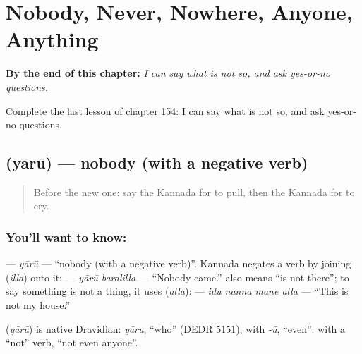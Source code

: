 
\chapter{Nobody, Never, Nowhere, Anyone, Anything}
\label{ch:ka-nobody-never-nowhere-anyone-anything}

\begin{chapteropening}
\textbf{By the end of this chapter:} \emph{I can say what is not so, and ask yes-or-no questions.}

Complete the last lesson of chapter 154: I can say what is not so, and ask yes-or-no questions.
\end{chapteropening}

\section[\texorpdfstring{\kn{ಯಾರೂ} (yārū)}{ಯಾರೂ (yārū)}]{ (yārū) — nobody (with a negative verb)}

\label{lesson:KA-C154-yaru}



\begin{quote}
Before the new one: say the Kannada for to pull, then the Kannada for to cry.
\end{quote}

\subsection*{You'll want to know: }
\textbf{} — \emph{yārū} — \textquotedblleft{}nobody (with a negative verb)\textquotedblright{}. Kannada negates a verb by joining \textbf{} (\emph{illa}) onto it: \textbf{ } — \emph{yārū baralilla} — \textquotedblleft{}Nobody came.\textquotedblright{} \textbf{} also means \textquotedblleft{}is not there\textquotedblright{}; to say something is not a thing, it uses \textbf{} (\emph{alla}): \textbf{   } — \emph{idu nanna mane alla} — \textquotedblleft{}This is not my house.\textquotedblright{}

\begin{cousinweb}
\textbf{} (\emph{yārū}) is native Dravidian: \emph{yāru}, \textquotedblleft{}who\textquotedblright{} (DEDR 5151), with \emph{-ū}, \textquotedblleft{}even\textquotedblright{}: with a \textquotedblleft{}not\textquotedblright{} verb, \textquotedblleft{}not even anyone\textquotedblright{}.
\end{cousinweb}

